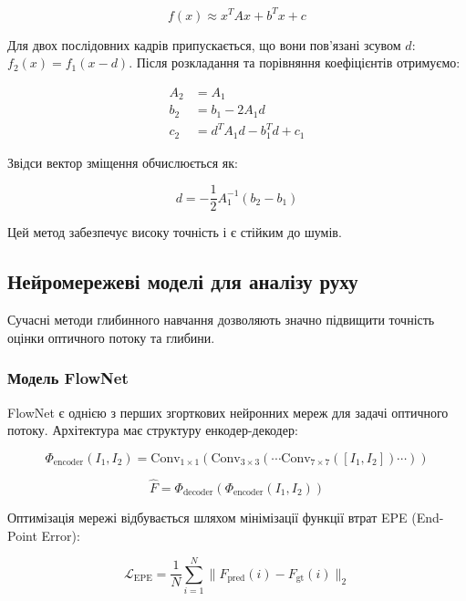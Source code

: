 \documentclass[14pt, a4paper]{extarticle}
\numberwithin{equation}{section}
\begin{document}
\begin{equation}
f(x) \approx x^T A x + b^T x + c \tag{1}
\end{equation}

Для двох послідовних кадрів припускається, що вони пов'язані зсувом $d$: $f_2(x) = f_1(x-d)$. Після розкладання та порівняння коефіцієнтів отримуємо:

\begin{align}
A_2 &= A_1 \tag{4} \\
b_2 &= b_1 - 2A_1 d \tag{5} \\
c_2 &= d^T A_1 d - b_1^T d + c_1 \tag{6}
\end{align}

Звідси вектор зміщення обчислюється як:

\begin{equation}
d = -\frac{1}{2} A_1^{-1} (b_2 - b_1) \tag{7}
\end{equation}

Цей метод забезпечує високу точність і є стійким до шумів.

\subsection{Нейромережеві моделі для аналізу руху}

Сучасні методи глибинного навчання дозволяють значно підвищити точність оцінки оптичного потоку та глибини.

\subsubsection{Модель FlowNet}

FlowNet \cite{dosovitskiy2015flownet} є однією з перших згорткових нейронних мереж для задачі оптичного потоку. Архітектура має структуру енкодер-декодер:

\begin{equation}
\Phi_{\text{encoder}}(I_1, I_2) = \text{Conv}_{1 \times 1}(\text{Conv}_{3 \times 3}(\cdots \text{Conv}_{7 \times 7}([I_1, I_2])\cdots)) \tag{16}
\end{equation}

\begin{equation}
\hat{F} = \Phi_{\text{decoder}}(\Phi_{\text{encoder}}(I_1, I_2)) \tag{17}
\end{equation}

Оптимізація мережі відбувається шляхом мінімізації функції втрат EPE (End-Point Error):

\begin{equation}
\mathcal{L}_{\text{EPE}} = \frac{1}{N} \sum_{i=1}^N \|F_{\text{pred}}(i) - F_{\text{gt}}(i)\|_2 \tag{18}
\end{equation}
\end{document}
